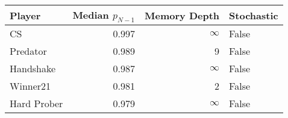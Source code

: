 \begin{tabular}{lrrl}
\toprule
      Player &  Median $p_{N-1}$ &  Memory Depth & Stochastic \\
\midrule
          CS &             0.997 &            \(\infty\) &      False \\
    Predator &             0.989 &             9 &      False \\
   Handshake &             0.987 &            \(\infty\) &      False \\
    Winner21 &             0.981 &             2 &      False \\
 Hard Prober &             0.979 &            \(\infty\) &      False \\
\bottomrule
\end{tabular}
